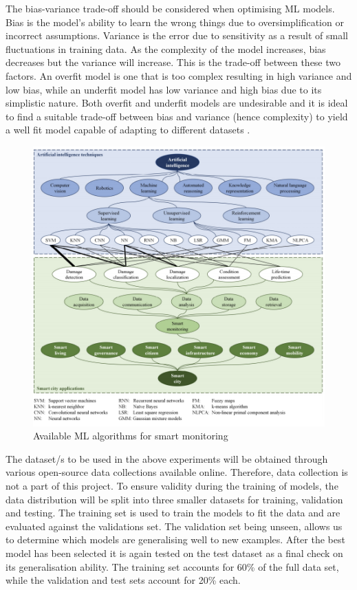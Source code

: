 \documentclass[a4paper,12pt]{report}
\begin{document}
The bias-variance trade-off should be considered when optimising ML models. 
Bias is the model’s ability to learn the wrong things due to oversimplification or incorrect assumptions. 
Variance is the error due to sensitivity as a result of small fluctuations in training data. 
As the complexity of the model increases, bias decreases but the variance will increase. 
This is the trade-off between these two factors. 
An overfit model is one that is too complex resulting in high variance and low bias, while an underfit model has low variance and high bias due to its simplistic nature. 
Both overfit and underfit models are undesirable and it is ideal to find a suitable trade-off between bias and variance (hence complexity) to yield a well fit model capable of adapting to different datasets \cite{Jedamski}. 

\begin{figure}[H]
    \centering
    \includegraphics[width=\textwidth]{smart monitoring algorithms.png}
    \caption{Available ML algorithms for smart monitoring \cite{inproceedings}}
    \label{fig:algor}
\end{figure}

\enlargethispage{\baselineskip}
The dataset/s to be used in the above experiments will be obtained through various open-source data collections available online. 
Therefore, data collection is not a part of this project.
To ensure validity during the training of models, the data distribution will be split into three smaller datasets for training, validation and testing. 
The training set is used to train the models to fit the data and are evaluated against the validations set. 
The validation set being unseen, allows us to determine which models are generalising well to new examples. 
After the best model has been selected it is again tested on the test dataset as a final check on its generalisation ability. 
The training set accounts for 60\% of the full data set, while the validation and test sets account for 20\% each. 
\end{document}
